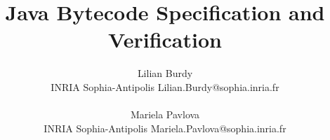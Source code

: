 \documentclass[a4paper,10pt]{article}
\begin{document}
\title{ Java Bytecode Specification and Verification }


\author{
       Lilian Burdy\\
        INRIA Sophia-Antipolis
       Lilian.Burdy@sophia.inria.fr \\
\\
        Mariela Pavlova\\
        INRIA Sophia-Antipolis
        Mariela.Pavlova@sophia.inria.fr
}


\maketitle
\begin{abstract}

\end{abstract}




%







\end{document}
